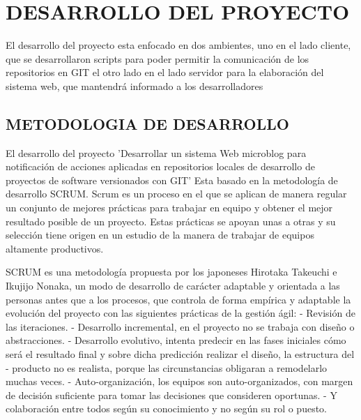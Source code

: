 

%
\chapter{DESARROLLO DEL PROYECTO}
El desarrollo del proyecto esta enfocado en dos ambientes, uno en el lado cliente, que se desarrollaron scripts para poder permitir la comunicación de los repositorios en GIT
el otro lado en el lado servidor para la elaboración del sistema web, que mantendrá informado a los desarrolladores
\section{METODOLOGIA DE DESARROLLO}
El desarrollo del proyecto 'Desarrollar un sistema Web microblog para notificación de acciones aplicadas en repositorios locales de desarrollo de proyectos de software versionados con GIT' Esta basado en la metodología de desarrollo SCRUM.
Scrum es un proceso en el que se aplican de manera regular un conjunto de mejores prácticas para trabajar en equipo y obtener el mejor resultado posible de un proyecto. Estas prácticas se apoyan unas a otras y su selección tiene origen en un estudio de la manera de trabajar de equipos altamente productivos.

SCRUM es una metodología propuesta por los japoneses Hirotaka Takeuchi e Ikujijo Nonaka, un modo de desarrollo de carácter adaptable y orientada a las personas antes
que a los procesos, que controla de forma empírica y adaptable la evolución del proyecto con las siguientes prácticas de la gestión ágil:
       - Revisión de las iteraciones.
       - Desarrollo incremental, en el proyecto no se trabaja con diseño o
        abstracciones.
       - Desarrollo evolutivo, intenta predecir en las fases iniciales cómo será el
         resultado final y sobre dicha predicción realizar el diseño, la estructura del
        - producto no es realista, porque las circunstancias obligaran a remodelarlo
          muchas veces.
       - Auto-organización, los equipos son auto-organizados, con margen de decisión
         suficiente para tomar las decisiones que consideren oportunas.
       - Y colaboración entre todos según su conocimiento y no según su rol o puesto.

